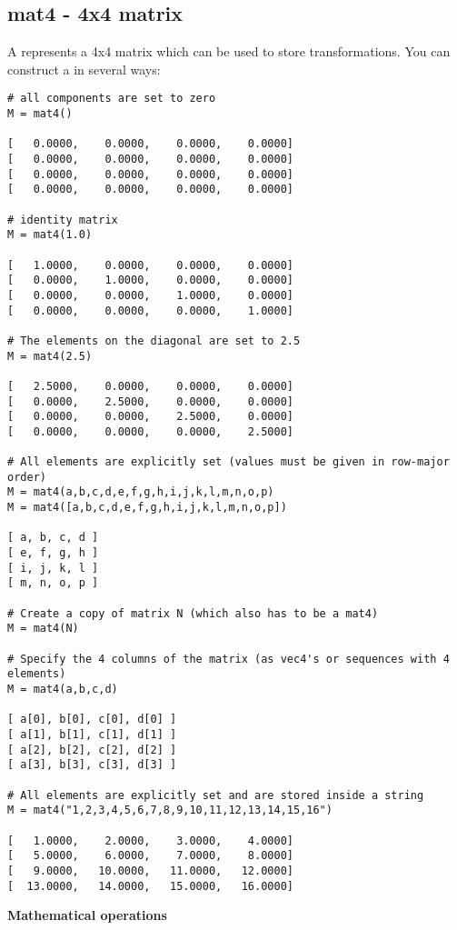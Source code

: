 \subsection{mat4 - 4x4 matrix}
\label{mat4}

A  represents a 4x4 matrix which can be used to store
transformations. You can construct a  in several ways:

\begin{verbatim}
# all components are set to zero
M = mat4()

[   0.0000,    0.0000,    0.0000,    0.0000]
[   0.0000,    0.0000,    0.0000,    0.0000]
[   0.0000,    0.0000,    0.0000,    0.0000]
[   0.0000,    0.0000,    0.0000,    0.0000]

# identity matrix
M = mat4(1.0)

[   1.0000,    0.0000,    0.0000,    0.0000]
[   0.0000,    1.0000,    0.0000,    0.0000]
[   0.0000,    0.0000,    1.0000,    0.0000]
[   0.0000,    0.0000,    0.0000,    1.0000]

# The elements on the diagonal are set to 2.5
M = mat4(2.5)

[   2.5000,    0.0000,    0.0000,    0.0000]
[   0.0000,    2.5000,    0.0000,    0.0000]
[   0.0000,    0.0000,    2.5000,    0.0000]
[   0.0000,    0.0000,    0.0000,    2.5000]

# All elements are explicitly set (values must be given in row-major order)
M = mat4(a,b,c,d,e,f,g,h,i,j,k,l,m,n,o,p)
M = mat4([a,b,c,d,e,f,g,h,i,j,k,l,m,n,o,p])

[ a, b, c, d ]
[ e, f, g, h ]
[ i, j, k, l ]
[ m, n, o, p ]

# Create a copy of matrix N (which also has to be a mat4)
M = mat4(N)

# Specify the 4 columns of the matrix (as vec4's or sequences with 4 elements)
M = mat4(a,b,c,d)

[ a[0], b[0], c[0], d[0] ]
[ a[1], b[1], c[1], d[1] ]
[ a[2], b[2], c[2], d[2] ]
[ a[3], b[3], c[3], d[3] ]

# All elements are explicitly set and are stored inside a string
M = mat4("1,2,3,4,5,6,7,8,9,10,11,12,13,14,15,16")

[   1.0000,    2.0000,    3.0000,    4.0000]
[   5.0000,    6.0000,    7.0000,    8.0000]
[   9.0000,   10.0000,   11.0000,   12.0000]
[  13.0000,   14.0000,   15.0000,   16.0000]
\end{verbatim}

{\bf Mathematical operations}

